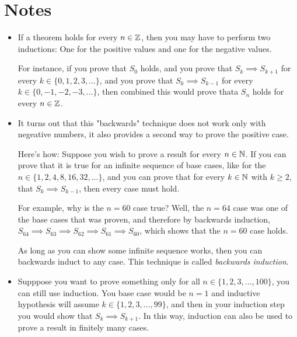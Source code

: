 \section*{Notes}

\begin{itemize}
	\item If a theorem holds for every $n \in \mathbb{Z}$, then you may have to perform two inductions: One for the positive values and one for the negative values.

		For instance, if you prove that $S_0$ holds, and you prove that $S_k \implies S_{k+1}$ for every $k \in \{0,1,2,3,...\}$, and you prove that $S_k \implies S_{k-1}$ for every $k \in \{0,-1,-2,-3,...\}$, then combined this would prove thata $S_n$ holds for every $n \in \mathbb{Z}$.

	\item It turns out that this "backwards" technique does not work only with negeative numbers, it also provides a second way to prove the positive case. 

		Here's how: Suppose you wish to prove a result for every $n \in \mathbb{N}$. If you can prove that it is true for an infinite sequence of base cases, like for the $n \in \{1, 2, 4, 8, 16, 32, ...\}$, and you can prove that for every $k \in \mathbb{N}$ with $k \geq 2$, that $S_k \implies S_{k-1}$, then every case must hold.

		For example, why is the $n = 60$ case true? Well, the $n = 64$ case was one of the base cases that was proven, and therefore by backwards induction, $S_64 \implies S_63 \implies S_62 \implies S_61 \implies S_60$, which shows that the $n = 60$ case holds.

		As long as you can show some infinite sequence works, then you can backwards induct to any case. This technique is called \emph{backwards induction}.


	\item Supppose you want to prove something only for all $n \in \{1, 2, 3, ..., 100\}$, you can still use induction. You base case would be $n = 1$ and inductive hypothesis will assume $k \in \{1,2,3,...,99\}$, and then in your induction step you would show that $S_k \implies S_{k+1}$. In this way, induction can also be used to prove a result in finitely many cases.
\end{itemize}


